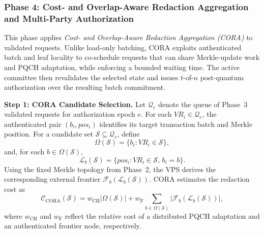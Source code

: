 \documentclass[lettersize,journal]{IEEEtran}
\begin{document}
    
  \subsubsection*{\textbf{Phase 4: Cost- and Overlap-Aware Redaction
Aggregation and Multi-Party Authorization}}

This phase applies \emph{Cost- and Overlap-Aware Redaction Aggregation
(CORA)} to validated requests. Unlike load-only batching, CORA exploits
authenticated batch and leaf locality to co-schedule requests that can
share Merkle-update work and PQCH adaptation, while enforcing a bounded
waiting time. The active committee then revalidates the selected state
and issues $t$-of-$n$ post-quantum authorization over the resulting
batch commitment.

\medskip
\noindent\textbf{Step 1: CORA Candidate Selection.}
Let $\mathcal{Q}_e$ denote the queue of Phase~3 validated requests for
authorization epoch $e$. For each $VR_i\in\mathcal{Q}_e$, the authenticated
pair $(b_i,pos_i)$ identifies its target transaction batch and Merkle
position. For a candidate set $\mathcal{S}\subseteq\mathcal{Q}_e$, define
\begin{equation}
\Omega(\mathcal{S})
=
\{b_i:VR_i\in\mathcal{S}\},
\end{equation}
and, for each $b\in\Omega(\mathcal{S})$,
\begin{equation}
\mathcal{L}_b(\mathcal{S})
=
\{pos_i:VR_i\in\mathcal{S},\,b_i=b\}.
\end{equation}
Using the fixed Merkle topology from Phase~2, the VPS derives the
corresponding external frontier
$\mathcal{F}_b(\mathcal{L}_b(\mathcal{S}))$. CORA estimates the
redaction cost as
\begin{equation}
\mathcal{C}_{\mathrm{CORA}}(\mathcal{S})
=
w_{\mathrm{CH}}|\Omega(\mathcal{S})|
+
w_{\mathrm{F}}
\sum_{b\in\Omega(\mathcal{S})}
|\mathcal{F}_b(\mathcal{L}_b(\mathcal{S}))|,
\end{equation}
where $w_{\mathrm{CH}}$ and $w_{\mathrm{F}}$ reflect the relative cost
of a distributed PQCH adaptation and an authenticated frontier node,
respectively.
\end{document}
